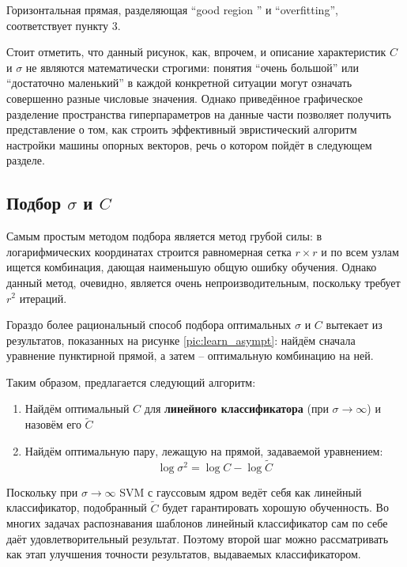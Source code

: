 \documentclass[14pt,a4paper,article]{ncc}
\numberwithin{equation}{subsection}
\begin{document}
Горизонтальная прямая, разделяющая ``good region '' и ``overfitting'', соответствует пункту 3.

Стоит отметить, что данный рисунок, как, впрочем, и описание характеристик $C$ и $\sigma$ не являются математически строгими: понятия ``очень большой'' или ``достаточно маленький'' в каждой конкретной ситуации могут означать совершенно разные числовые значения. Однако приведённое графическое разделение пространства гиперпараметров на данные части позволяет получить представление о том, как строить эффективный эвристический алгоритм настройки машины опорных векторов, речь о котором пойдёт в следующем разделе.

\subsection{Подбор $\sigma$ и $C$}

Самым простым методом подбора является метод грубой силы: в логарифмических координатах строится равномерная сетка $r \times r$ и по $\textit{всем узлам}$ ищется комбинация, дающая наименьшую общую ошибку обучения. Однако данный метод, очевидно, является очень непроизводительным, поскольку требует $r^2$ итераций.

Гораздо более рациональный способ подбора оптимальных $\sigma$ и $C$ вытекает из результатов, показанных на рисунке \ref{pic:learn_asympt}: найдём сначала уравнение пунктирной прямой, а затем -- оптимальную комбинацию на ней.

Таким образом, предлагается следующий алгоритм:

\begin{enumerate}
	\item Найдём оптимальный $C$ для \textbf{линейного классификатора} (при $\sigma \rightarrow \infty$) и назовём его $\tilde{C}$
	\item Найдём оптимальную пару, лежащую на прямой, задаваемой уравнением:
	\begin{equation} \label{opt_line}
	\log \sigma^2 = \log C - \log \tilde{C}
	\end{equation}
\end{enumerate}

Поскольку при $\sigma \rightarrow \infty$ SVM с гауссовым ядром ведёт себя как линейный классификатор, подобранный $\tilde{C}$ будет гарантировать хорошую обученность. Во многих задачах распознавания шаблонов линейный классификатор сам по себе даёт удовлетворительный результат.
Поэтому второй шаг можно рассматривать как этап улучшения точности результатов, выдаваемых классификатором.
\end{document}
